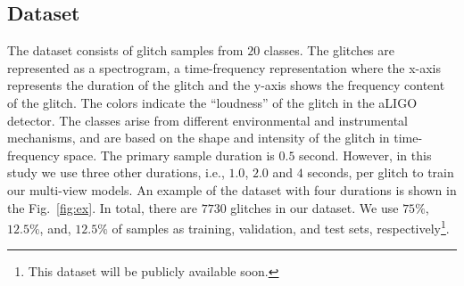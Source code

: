 \documentclass{article}
\begin{document}
\subsection{Dataset}The dataset consists of glitch samples from $20$ classes. The glitches are represented as a spectrogram, a time-frequency representation where the x-axis represents the duration of the glitch and the y-axis shows the frequency content of the glitch. The colors indicate the ``loudness'' of the glitch in the aLIGO detector. The classes arise from different environmental and instrumental mechanisms, and are based on the shape and intensity of the glitch in time-frequency space. 
The primary sample duration is $0.5$ second. However, in this study we use three other durations, i.e., $1.0$, $2.0$ and $4$ seconds, per glitch to train our multi-view models. An example of the dataset with four durations is shown in the Fig.~\ref{fig:ex}. In total, there are $7730$ glitches in our dataset. We use $75\%$, $12.5\%$, and, $12.5\%$ of samples as training, validation, and test sets, respectively\footnote{This dataset will be publicly available soon.}. 
\begin{comment}
\subsection{Preprocessing}
Omega Scans \cite{OmegaScan} are used in the pipeline for the detection of gravitational wave. Therefore, it seems reasonable to visualize the glitches. Each image has the glitch fixed at the center of the Omega Scan (centered at time $0$), and each glitch is visualized using four different time windows ($\pm$ 0.25, 0.5, 1.0, and 2.0 seconds) to accommodate all kinds of glitches, i.e., long-duration and short-duration. \textcolor{blue}{I would get rid of this section, or merge it with the previous section. I think 'Omega Scans' might be too jargony for this paper, and everything else in this section is somewhat redundant with previous sections. Also, Omega Scans aren't really used for gravitational wave 'detection', moreso for their visualization. If you want to mention Omega Scans, you could say something along this lines of 'aLIGO scientists visualize gravitational-wave data with Omega Scans, which are similar to spectrograms but optimized for viewing gravitational-wave data.'}%
\end{comment} 
\end{document}
